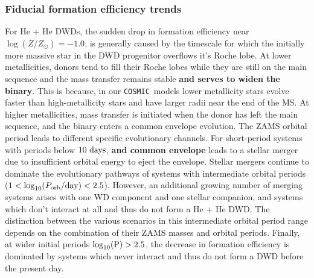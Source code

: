 \documentclass[twocolumn, linenumbers]{aastex631}
\newcommand{\cosmic}{\texttt{COSMIC}}
\begin{document}
\subsubsection{\textbf{Fiducial formation efficiency trends}}\label{sec:formeff_fid}

For He + He DWDs, the sudden drop in formation efficiency near $\log(Z/Z_{\odot})=-1.0$, is generally caused by the timescale for which the initially more massive star in the DWD progenitor overflows it's Roche lobe. At lower metallicities, donors tend to fill their Roche lobes while they are still on the main sequence and the mass transfer remains stable \textbf{and serves to widen the binary}. This is because, in our \cosmic\ models lower metallicity stars evolve faster than high-metallicity stars and have larger radii near the end of the MS. At higher metallicities, mass transfer is initiated when the donor has left the main sequence, and the binary enters a common envelope evolution. The ZAMS orbital period leads to different specific evolutionary channels. For short-period systems with periods below $10~\rm{days}$, \textbf{and common envelope} leads to a stellar merger due to insufficient orbital energy to eject the envelope. Stellar mergers continue to dominate the evolutionary pathways of systems with intermediate orbital periods ($1 < \log_{10}(P_{\rm{orb}}/\rm{day}) < 2.5$). However, an additional growing number of merging systems arises with one WD component and one stellar companion, and systems which don't interact at all and thus do not form a He + He DWD. The distinction between the various scenarios in this intermediate orbital period range depends on the combination of their ZAMS masses and orbital periods. Finally, at wider initial periods $\log_{10}(\rm{P}) > 2.5$, the decrease in formation efficiency is dominated by systems which never interact and thus do not form a DWD before the present day.
\end{document}
